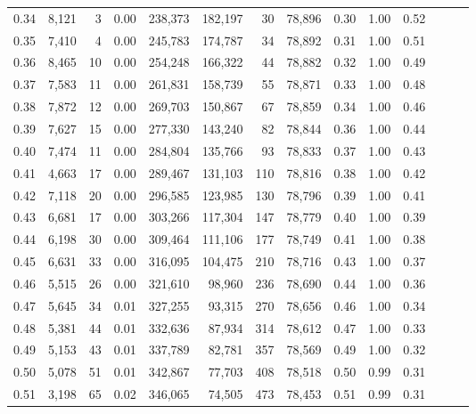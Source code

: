 \begin{tabular}{rrrrrrrrrrrrrr}
0.34 &   8,121 &      3 &  0.00 &  238,373 &  182,197 &      30 &  78,896 &  0.30 &  1.00 &      0.52 \\
0.35 &   7,410 &      4 &  0.00 &  245,783 &  174,787 &      34 &  78,892 &  0.31 &  1.00 &      0.51 \\
0.36 &   8,465 &     10 &  0.00 &  254,248 &  166,322 &      44 &  78,882 &  0.32 &  1.00 &      0.49 \\
0.37 &   7,583 &     11 &  0.00 &  261,831 &  158,739 &      55 &  78,871 &  0.33 &  1.00 &      0.48 \\
0.38 &   7,872 &     12 &  0.00 &  269,703 &  150,867 &      67 &  78,859 &  0.34 &  1.00 &      0.46 \\
0.39 &   7,627 &     15 &  0.00 &  277,330 &  143,240 &      82 &  78,844 &  0.36 &  1.00 &      0.44 \\
0.40 &   7,474 &     11 &  0.00 &  284,804 &  135,766 &      93 &  78,833 &  0.37 &  1.00 &      0.43 \\
0.41 &   4,663 &     17 &  0.00 &  289,467 &  131,103 &     110 &  78,816 &  0.38 &  1.00 &      0.42 \\
0.42 &   7,118 &     20 &  0.00 &  296,585 &  123,985 &     130 &  78,796 &  0.39 &  1.00 &      0.41 \\
0.43 &   6,681 &     17 &  0.00 &  303,266 &  117,304 &     147 &  78,779 &  0.40 &  1.00 &      0.39 \\
0.44 &   6,198 &     30 &  0.00 &  309,464 &  111,106 &     177 &  78,749 &  0.41 &  1.00 &      0.38 \\
0.45 &   6,631 &     33 &  0.00 &  316,095 &  104,475 &     210 &  78,716 &  0.43 &  1.00 &      0.37 \\
0.46 &   5,515 &     26 &  0.00 &  321,610 &   98,960 &     236 &  78,690 &  0.44 &  1.00 &      0.36 \\
0.47 &   5,645 &     34 &  0.01 &  327,255 &   93,315 &     270 &  78,656 &  0.46 &  1.00 &      0.34 \\
0.48 &   5,381 &     44 &  0.01 &  332,636 &   87,934 &     314 &  78,612 &  0.47 &  1.00 &      0.33 \\
0.49 &   5,153 &     43 &  0.01 &  337,789 &   82,781 &     357 &  78,569 &  0.49 &  1.00 &      0.32 \\
0.50 &   5,078 &     51 &  0.01 &  342,867 &   77,703 &     408 &  78,518 &  0.50 &  0.99 &      0.31 \\
0.51 &   3,198 &     65 &  0.02 &  346,065 &   74,505 &     473 &  78,453 &  0.51 &  0.99 &      0.31 \\

\end{tabular}
